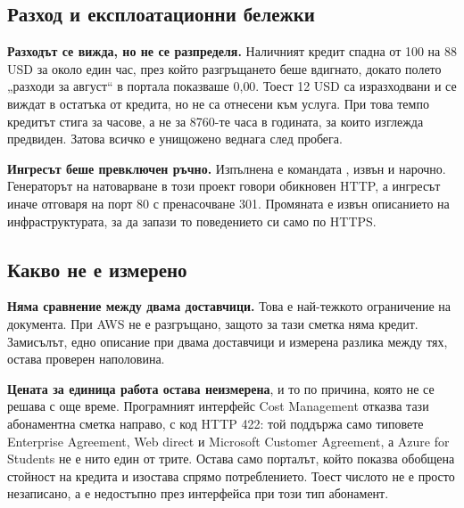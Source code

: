 \subsection{Разход и експлоатационни бележки}

\textbf{Разходът се вижда, но не се разпределя.} Наличният кредит спадна от 100 на 88 USD за около един
час, през който разгръщането беше вдигнато, докато полето „разходи за август“ в портала показваше
0{,}00. Тоест 12 USD са изразходвани и се виждат в остатъка от кредита,
но не са отнесени към услуга. При това темпо кредитът стига за часове, а не за 8760-те часа в
годината, за които изглежда предвиден. Затова всичко е унищожено веднага след пробега.

\textbf{Ингресът беше превключен ръчно.} Изпълнена е командата
, извън  и нарочно.
Генераторът на натоварване в този проект говори обикновен HTTP, а ингресът иначе отговаря на порт
80 с пренасочване 301. Промяната е извън описанието на инфраструктурата, за да запази то
поведението си само по HTTPS.

\subsection{Какво не е измерено}

\textbf{Няма сравнение между двама доставчици.} Това е най-тежкото ограничение на документа. При
AWS не е разгръщано, защото за тази сметка няма кредит. Замисълът, едно описание при двама доставчици и
измерена разлика между тях, остава проверен наполовина.

\textbf{Цената за единица работа остава неизмерена}, и то по причина, която не се решава с още
време. Програмният интерфейс Cost Management отказва тази абонаментна сметка направо, с код
HTTP 422: той поддържа само типовете Enterprise Agreement, Web direct и Microsoft Customer
Agreement, а Azure for Students не е нито един от трите. Остава само порталът, който показва
обобщена стойност на кредита и изостава спрямо потреблението. Тоест числото не е просто
незаписано, а е недостъпно през интерфейса при този тип абонамент.
